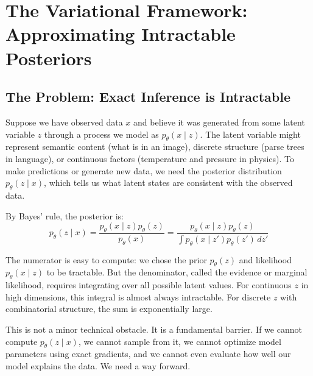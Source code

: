 \vspace{2em}

\section{The Variational Framework: Approximating Intractable Posteriors}
\label{sec:variational_framework}

\vspace{1em}

\subsection{The Problem: Exact Inference is Intractable}

Suppose we have observed data $x$ and believe it was generated from some latent variable $z$ through a process we model as $p_\theta(x \mid z)$. The latent variable might represent semantic content (what is in an image), discrete structure (parse trees in language), or continuous factors (temperature and pressure in physics). To make predictions or generate new data, we need the posterior distribution $p_\theta(z \mid x)$, which tells us what latent states are consistent with the observed data.

\vspace{0.3cm}

By Bayes' rule, the posterior is:
%
\begin{equation}
p_\theta(z \mid x) = \frac{p_\theta(x \mid z) p_\theta(z)}{p_\theta(x)}
= \frac{p_\theta(x \mid z) p_\theta(z)}{\int p_\theta(x \mid z') p_\theta(z') \, dz'}
\end{equation}

\vspace{0.3cm}

The numerator is easy to compute: we chose the prior $p_\theta(z)$ and likelihood $p_\theta(x \mid z)$ to be tractable. But the denominator, called the evidence or marginal likelihood, requires integrating over all possible latent values. For continuous $z$ in high dimensions, this integral is almost always intractable. For discrete $z$ with combinatorial structure, the sum is exponentially large.

\vspace{0.3cm}

This is not a minor technical obstacle. It is a fundamental barrier. If we cannot compute $p_\theta(z \mid x)$, we cannot sample from it, we cannot optimize model parameters using exact gradients, and we cannot even evaluate how well our model explains the data. We need a way forward.

